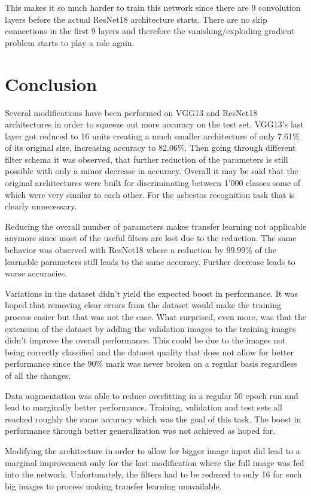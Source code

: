 This makes it so much harder to train this network since there are 9 convolution layers before the actual ResNet18 architecture starts. There are no skip connections in the first 9 layers and therefore the vanishing/exploding gradient problem starts to play a role again.


\section{Conclusion}

Several modifications have been performed on VGG13 and ResNet18 architectures in order to squeeze out more accuracy on the test set. VGG13's last layer got reduced to 16 units creating a much smaller architecture of only 7.61\% of its original size, increasing accuracy to 82.06\%. Then going through different filter schema it was observed, that further reduction of the parameters is still possible with only a minor decrease in accuracy. Overall it may be said that the original architectures were built for discriminating between 1'000 classes some of which were very similar to each other. For the asbestos recognition task that is clearly unnecessary.

Reducing the overall number of parameters makes transfer learning not applicable anymore since most of the useful filters are lost due to the reduction. The same behavior was observed with ResNet18 where a reduction by 99.99\% of the learnable parameters still leads to the same accuracy. Further decrease leads to worse accuracies.

Variations in the dataset didn't yield the expected boost in performance. It was hoped that removing clear errors from the dataset would make the training process easier but that was not the case. What surprised, even more, was that the extension of the dataset by adding the validation images to the training images didn't improve the overall performance. This could be due to the images not being correctly classified and the dataset quality that does not allow for better performance since the 90\% mark was never broken on a regular basis regardless of all the changes.

Data augmentation was able to reduce overfitting in a regular 50 epoch run and lead to marginally better performance. Training, validation and test sets all reached roughly the same accuracy which was the goal of this task. The boost in performance through better generalization was not achieved as hoped for.

Modifying the architecture in order to allow for bigger image input did lead to a marginal improvement only for the last modification where the full image was fed into the network. Unfortunately, the filters had to be reduced to only 16 for such big images to process making transfer learning unavailable.

